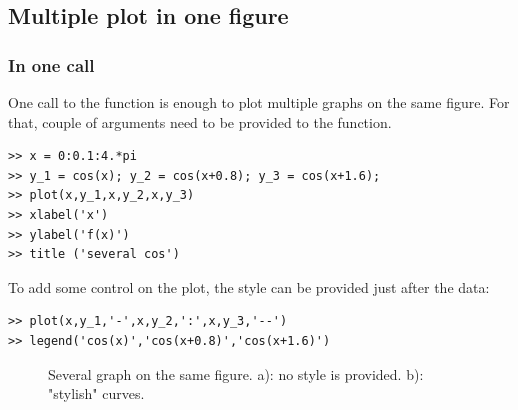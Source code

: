	\subsection{Multiple plot in one figure}
		\subsubsection{In one call}
			One call to the function  is enough to plot multiple graphs on the same figure.
			For that, couple of arguments need to be provided to the  function.
\begin{lstlisting}
>> x = 0:0.1:4.*pi
>> y_1 = cos(x); y_2 = cos(x+0.8); y_3 = cos(x+1.6);
>> plot(x,y_1,x,y_2,x,y_3)
>> xlabel('x')
>> ylabel('f(x)')
>> title ('several cos')
\end{lstlisting}
			To add some control on the plot, the style can be provided just after the data:
\begin{lstlisting}
>> plot(x,y_1,'-',x,y_2,':',x,y_3,'--')
>> legend('cos(x)','cos(x+0.8)','cos(x+1.6)')
\end{lstlisting}

		\begin{figure}
			\center
			\caption{
				Several graph on the same figure.
				a): no style is provided. 
				b): "stylish" curves.
			}
			\label{fig-multi}
		\end{figure}	
